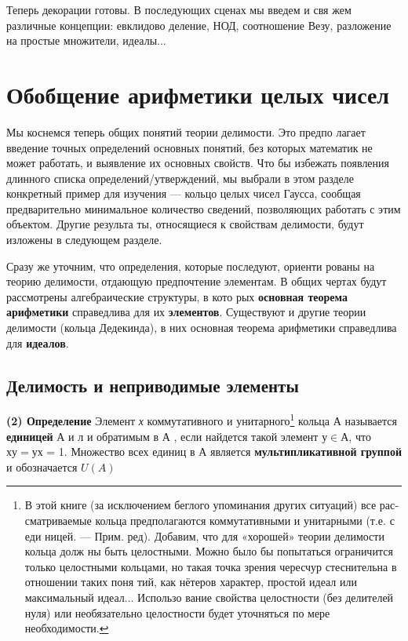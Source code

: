 Теперь  декорации готовы. В  последующих сценах мы  введем и свя­
жем различные концепции: евклидово деление, НОД, соотношение Везу, 
разложение на простые  множители,  идеалы...
\section{Обобщение арифметики целых чисел}
\noindent Мы  коснемся  теперь  общих  понятий  теории  делимости.  Это  предпо­
лагает  введение  точных  определений  основных  понятий,  без  которых 
математик не может работать, и выявление их основных свойств.  Что­
бы избежать появления длинного списка определений/утверждений, мы
\pagebreak
выбрали  в  этом  разделе  конкретный  пример  для  изучения  — кольцо 
целых чисел Гаусса, сообщая предварительно минимальное количество 
сведений,  позволяющих  работать с  этим  объектом.  Другие  результа­
ты, относящиеся к свойствам делимости, будут изложены в следующем 
разделе.

Сразу же  уточним, что определения,  которые последуют,  ориенти­
рованы  на теорию  делимости,  отдающую предпочтение  элементам.  В 
общих чертах будут рассмотрены  алгебраические  структуры,  в  кото­
рых 
\textbf{основная  теорема  арифметики} 
справедлива для  их 
\textbf{элемен­тов}. 
Существуют  и  другие  теории  делимости  (кольца Дедекинда),  в 
них основная теорема арифметики справедлива для 
\textbf{идеалов}.
\subsection{Делимость и неприводимые элементы}

\noindent \textbf{(2) Определение}
Элемент  \textit{х}   коммутативного  и   унитарного\footnote{В  этой  книге  (за исключением беглого упоминания других ситуаций) все рас­
сматриваемые кольца предполагаются коммутативными и унитарными (т.е. 
с
 еди­
ницей. — 
Прим. ред).
 Добавим, что для «хорошей» теории делимости кольца долж­
ны быть целостными. Можно было бы попытаться ограничится только целостными
кольцами, но такая точка зрения чересчур стеснительна в отношении таких поня­
тий,  как  нётеров характер, простой идеал или  максимальный идеал...  Использо­
вание  свойства целостности  (без  делителей  нуля)  или  необязательно целостности
будет уточняться по мере необходимости.}
  кольца  А   называется
\textbf{единицей} 
А   и л и  обратимым в   А ,  если  найдется  такой элемент  $у \in А$,
что $ху  =  ух$ =  1. 
Множество  всех единиц в   А   является
 \textbf{мультиплика­тивной группой} 
и  обозначается $U(A)$
\newline

